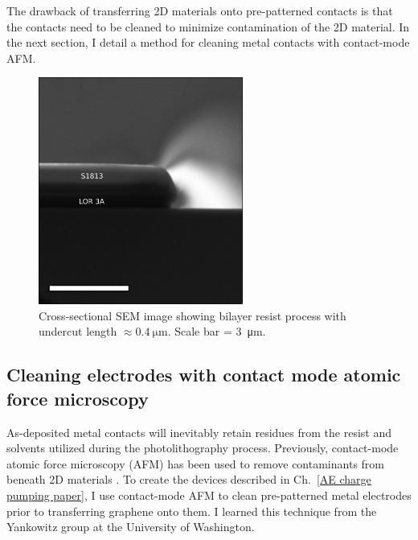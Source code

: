 \documentclass[double,12pt,1in,seploa]{beavtex}
\let\Oldsubsection\subsection
\renewcommand{\subsection}{\FloatBarrier\Oldsubsection}
\begin{document}
The drawback of transferring 2D materials onto pre-patterned contacts is that the contacts need to be cleaned to minimize contamination of the 2D material. In the next section, I detail a method for cleaning metal contacts with contact-mode AFM.


\begin{figure}
    \includegraphics[width = 0.6\textwidth]{LOR cross section_.png}
    \caption{Cross-sectional SEM image showing bilayer resist process with undercut length $\approx \SI{0.4}{\micro\meter}$. Scale bar = \SI{3}{\micro\meter}.}
    \label{fig:cross-section SEM}
\end{figure}

\subsection{Cleaning electrodes with contact mode atomic force microscopy} \label{AFM cleaning main section}

As-deposited metal contacts will inevitably retain residues from the resist and solvents utilized during the photolithography process. Previously, contact-mode atomic force microscopy (AFM) has been used to remove contaminants from beneath 2D materials \cite{goossens_mechanical_2012,chen_tip-based_2021}. To create the devices described in Ch.\ \ref{AE charge pumping paper}, I use contact-mode AFM to clean pre-patterned metal electrodes prior to transferring graphene onto them. I learned this technique from the Yankowitz group at the University of Washington.
\end{document}
